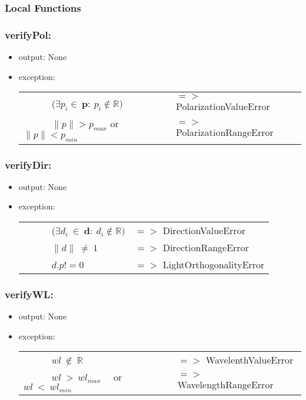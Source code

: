 \documentclass[12pt, titlepage]{article}
\begin{document}
\subsubsection{Local Functions}

\subsubsection*{verifyPol:}
\begin{itemize}
	\item output: None
	\item exception: 
		\begin{longtable*}[l]{l l}
		\ \ \ \ \ \ ($\exists p_i \in\ \textbf{p}:\ p_i \notin \mathbb{R})$ & $=>$ PolarizationValueError\\
		\ \ \ \ \ \ $\|p\| > p_{max}$ or $\|p\| < p_{min}$  & $=>$ PolarizationRangeError\\
	\end{longtable*}

\end{itemize}

\subsubsection*{verifyDir:}
\begin{itemize}
	\item output: None
	\item exception: 
	\noindent \begin{longtable*}[l]{l l}
		\ \ \ \ \ \ ($\exists d_i\  \in \ \textbf{d}:\ d_i \notin \mathbb{R})$ & $=>$ DirectionValueError\\
		\ \ \ \ \ \ $\|d\|\ \neq\ 1$ & $=>$ DirectionRangeError\\
		\ \ \ \ \ \ $d . p != 0$ & $=>$ LightOrthogonalityError\\
	\end{longtable*}
	
\end{itemize}

\subsubsection*{verifyWL:}
\begin{itemize}
	\item output: None
	\item exception: 
	\noindent \begin{longtable*}[l]{l l}
		\ \ \ \ \ \ $wl\  \notin \  \mathbb{R}$ & $=>$ WavelenthValueError\\
		\ \ \ \ \ \ $ wl\ >\ wl_{max}$ \ \ or \ \ $wl\ <\ wl_{min}$ & $=>$ WavelengthRangeError\\
	\end{longtable*}
	
\end{itemize}
\end{document}
